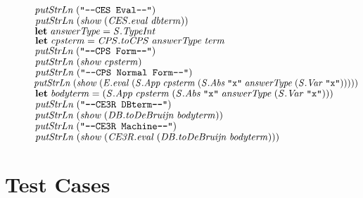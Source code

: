 \documentclass[10pt]{article}
\newcommand{\Conid}[1]{\mathit{#1}}
\newcommand{\Varid}[1]{\mathit{#1}}
\begin{document}
\begin{hscode}
${\hskip2.00em\relax\hskip1.00em\relax\Varid{putStrLn}\;(\text{\tt \char34 ----CES~Eval----\char34})}$\\
${\hskip2.00em\relax\hskip1.00em\relax\Varid{putStrLn}\;(\Varid{show}\;(\Varid{\Conid{CES}.eval}\;\Varid{dbterm}))}$\\
${}$\\
${}$\\
${\hskip2.00em\relax\hskip1.00em\relax\mathbf{let}\;\Varid{answerType}\mathrel{=}\Conid{\Conid{S}.TypeInt}}$\\
${\hskip2.00em\relax\hskip1.00em\relax\mathbf{let}\;\Varid{cpsterm}\mathrel{=}\Varid{\Conid{CPS}.toCPS}\;\Varid{answerType}\;\Varid{term}}$\\
${\hskip2.00em\relax\hskip1.00em\relax\Varid{putStrLn}\;(\text{\tt \char34 ----CPS~Form----\char34})}$\\
${\hskip2.00em\relax\hskip1.00em\relax\Varid{putStrLn}\;(\Varid{show}\;\Varid{cpsterm})}$\\
${\hskip2.00em\relax\hskip1.00em\relax\Varid{putStrLn}\;(\text{\tt \char34 ---CPS~Normal~Form----\char34})}$\\
${\hskip2.00em\relax\hskip1.00em\relax\Varid{putStrLn}\;(\Varid{show}\;(\Varid{\Conid{E}.eval}\;(\Conid{\Conid{S}.App}\;\Varid{cpsterm}\;(\Conid{\Conid{S}.Abs}\;\text{\tt \char34 x\char34}\;\Varid{answerType}\;(\Conid{\Conid{S}.Var}\;\text{\tt \char34 x\char34})))))}$\\
${}$\\
${\hskip2.00em\relax\hskip1.00em\relax\mathbf{let}\;\Varid{bodyterm}\mathrel{=}(\Conid{\Conid{S}.App}\;\Varid{cpsterm}\;(\Conid{\Conid{S}.Abs}\;\text{\tt \char34 x\char34}\;\Varid{answerType}\;(\Conid{\Conid{S}.Var}\;\text{\tt \char34 x\char34})))}$\\
${\hskip2.00em\relax\hskip1.00em\relax\Varid{putStrLn}\;(\text{\tt \char34 ----CE3R~DBterm----\char34})}$\\
${\hskip2.00em\relax\hskip1.00em\relax\Varid{putStrLn}\;(\Varid{show}\;(\Varid{\Conid{DB}.toDeBruijn}\;\Varid{bodyterm}))}$\\
${\hskip2.00em\relax\hskip1.00em\relax\Varid{putStrLn}\;(\text{\tt \char34 ----CE3R~Machine----\char34})}$\\
${\hskip2.00em\relax\hskip1.00em\relax\Varid{putStrLn}\;(\Varid{show}\;(\Varid{\Conid{CE3R}.eval}\;(\Varid{\Conid{DB}.toDeBruijn}\;\Varid{bodyterm})))}$\ColumnHook
\end{hscode}\resethooks


\section{Test Cases}
\end{document}
